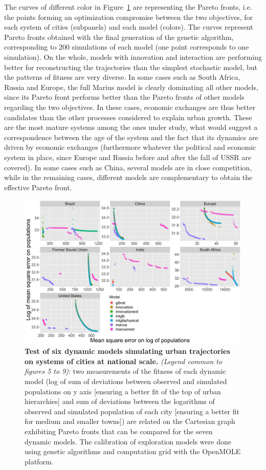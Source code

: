 \documentclass[11pt]{article}
\begin{document}
The curves of different color in Figure~\ref{fig:fig5} are representing the Pareto fronts, i.e. the points forming an optimization compromise between the two objectives, for each system of cities (subpanels) and each model (colors). The curves represent Pareto fronts obtained with the final generation of the genetic algorithm, corresponding to 200 simulations of each model (one point corresponds to one simulation). On the whole, models with innovation and interaction are performing better for reconstructing the trajectories than the simplest stochastic model, but the patterns of fitness are very diverse. In some cases such as South Africa, Russia and Europe, the full Marius model is clearly dominating all other models, since its Pareto front performs better than the Pareto fronts of other models regarding the two objectives. In these cases, economic exchanges are thus better candidates than the other processes considered to explain urban growth. These are the most mature systems among the ones under study, what would suggest a correspondence between the age of the system and the fact that its dynamics are driven by economic exchanges (furthermore whatever the political and economic system in place, since Europe and Russia before and after the fall of USSR are covered). In some cases such as China, several models are in close competition, while in the remaining cases, different models are complementary to obtain the effective Pareto front.

\begin{figure}
\centering
\includegraphics[width=\textwidth]{Fig5.png}
\caption{\textbf{Test of six dynamic models simulating urban trajectories on systems of cities at national scale.} \textit{(Legend common to figures 5 to 9)}: two measurements of the fitness of each dynamic model (log of sum of deviations between observed and simulated populations on y axis [ensuring a better fit of the top of urban hierarchies] and sum of deviations between the logarithms of observed and simulated population of each city [ensuring a better fit for medium and smaller towns]) are related on the Cartesian graph exhibiting Pareto fronts that can be compared for the seven dynamic models. The calibration of exploration models were done using genetic algorithms and computation grid with the OpenMOLE platform.\label{fig:fig5}}
\end{figure}   
\end{document}
